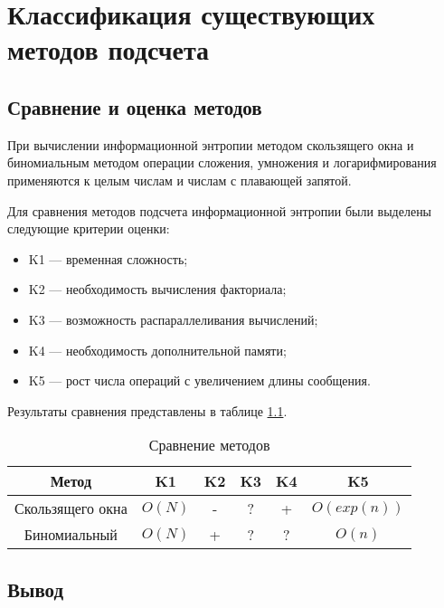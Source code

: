 \chapter{Классификация существующих методов подсчета}

\section{Сравнение и оценка методов}

При вычислении информационной энтропии методом скользящего окна и биномиальным методом операции сложения, умножения и логарифмирования применяются к целым числам и числам с плавающей запятой. 

Для сравнения методов подсчета информационной энтропии были выделены следующие критерии оценки:

\begin{itemize}
	\item K1 --- временная сложность;
	\item K2 --- необходимость вычисления факториала;
	\item K3 --- возможность распараллеливания вычислений;
	\item K4 --- необходимость дополнительной памяти;
	\item K5 --- рост числа операций с увеличением длины сообщения.
\end{itemize}

Результаты сравнения представлены в таблице \ref{tab:comparison}.

\begin{table}[h]
    \caption{Сравнение методов}
    \begin{center}
        \begin{tabular}{|c|c|c|c|c|c|}
        		\hline
            \textbf{Метод} & \textbf{K1} & \textbf{K2} & \textbf{K3}
             & \textbf{K4} & \textbf{K5} \\ \hline
            Скользящего окна &  $O(N)$ & - & ? & + & $O(exp(n))$ \\ \hline
            Биномиальный &  $O(N)$ & + & ? & ? & $O(n)$ \\  \hline
        \end{tabular}
    \end{center}
    \label{tab:comparison}
\end{table}

\section{Вывод}